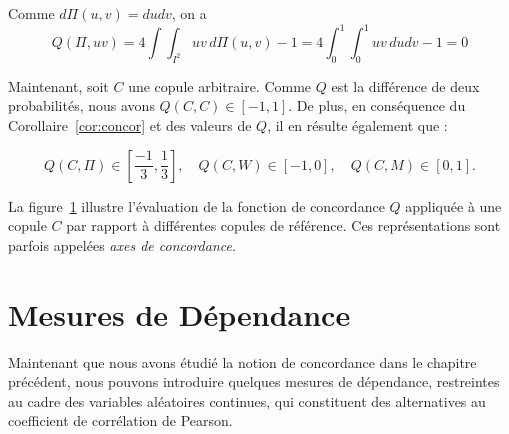 \documentclass[a4paper,11pt]{amsbook}
\numberwithin{equation}{chapter}
\theoremstyle{definition}
\begin{document}
Comme \( d\Pi(u,v) = du dv \),  on a
\[
Q(\Pi,uv) = 4 \int\int_{I^2} uv \, d\Pi(u,v) -1 = 4 \int_{0}^{1} \int_{0}^{1} uv \, du dv -1= 0 \tag{6}
\]



Maintenant, soit \( C \) une copule arbitraire. Comme \( Q \) est la différence de deux probabilités, nous avons \( Q(C,C) \in [-1,1] \). De plus, en conséquence du Corollaire~\ref{cor:concor} et des valeurs de \( Q \), il en résulte également que :

\[
Q(C,\Pi) \in \left[ \frac{-1}{3}, \frac{1}{3} \right], \quad Q(C,W) \in \left[ -1, 0 \right], \quad Q(C,M) \in \left[ 0,1 \right].
\]

La figure~\ref{fig:Qcopule} illustre l’évaluation de la fonction de concordance \( Q \) appliquée à une copule \( C \) par rapport à différentes copules de référence.  Ces représentations sont parfois appelées \emph{axes de concordance}.


\begin{figure}[H]
    \centering
    \caption{}
    \label{fig:Qcopule}
\end{figure}



\chapter{Mesures de Dépendance}
Maintenant que nous avons étudié la notion de concordance dans le chapitre précédent, nous pouvons introduire quelques mesures de dépendance, restreintes au cadre des variables aléatoires continues, qui constituent des alternatives au coefficient de corrélation de Pearson.
\end{document}
